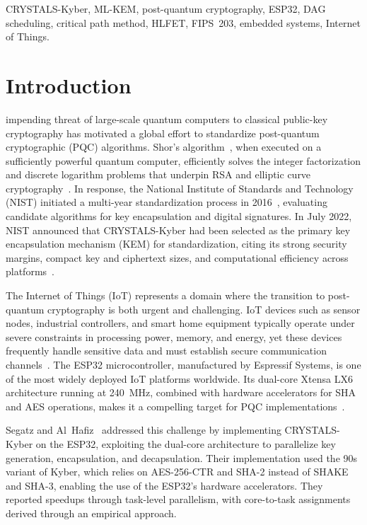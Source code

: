 \documentclass[journal]{IEEEtran}
\begin{document}
\begin{IEEEkeywords}
CRYSTALS-Kyber, ML-KEM, post-quantum cryptography, ESP32, DAG scheduling, critical path method, HLFET, FIPS~203, embedded systems, Internet of Things.
\end{IEEEkeywords}

\IEEEpeerreviewmaketitle

\section{Introduction}

 impending threat of large-scale quantum computers to classical public-key cryptography has motivated a global effort to standardize post-quantum cryptographic (PQC) algorithms. Shor's algorithm~\cite{shor1999}, when executed on a sufficiently powerful quantum computer, efficiently solves the integer factorization and discrete logarithm problems that underpin RSA and elliptic curve cryptography~\cite{buchmann2017}. In response, the National Institute of Standards and Technology (NIST) initiated a multi-year standardization process in 2016~\cite{takagi2016}, evaluating candidate algorithms for key encapsulation and digital signatures. In July 2022, NIST announced that CRYSTALS-Kyber had been selected as the primary key encapsulation mechanism (KEM) for standardization, citing its strong security margins, compact key and ciphertext sizes, and computational efficiency across platforms~\cite{nist2022announce, nist2022status}.

The Internet of Things (IoT) represents a domain where the transition to post-quantum cryptography is both urgent and challenging. IoT devices such as sensor nodes, industrial controllers, and smart home equipment typically operate under severe constraints in processing power, memory, and energy, yet these devices frequently handle sensitive data and must establish secure communication channels~\cite{schoffel2022}. The ESP32 microcontroller, manufactured by Espressif Systems, is one of the most widely deployed IoT platforms worldwide. Its dual-core Xtensa LX6 architecture running at 240~MHz, combined with hardware accelerators for SHA and AES operations, makes it a compelling target for PQC implementations~\cite{esp32trm, maier2017}.

Segatz and Al~Hafiz~\cite{segatz2022} addressed this challenge by implementing CRYSTALS-Kyber on the ESP32, exploiting the dual-core architecture to parallelize key generation, encapsulation, and decapsulation. Their implementation used the 90s variant of Kyber, which relies on AES-256-CTR and SHA-2 instead of SHAKE and SHA-3, enabling the use of the ESP32's hardware accelerators. They reported speedups through task-level parallelism, with core-to-task assignments derived through an empirical approach.
\end{document}
